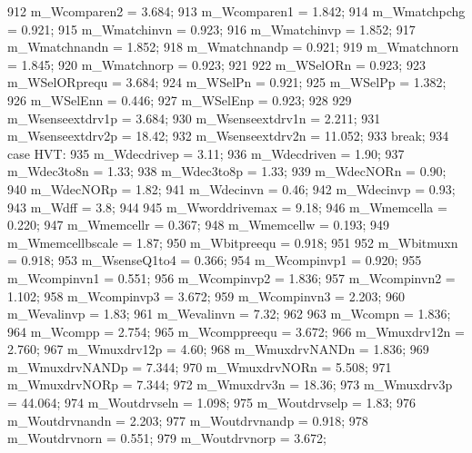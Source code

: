 \begin{DoxyCode}
{{{912                 m_Wcomparen2 = 3.684;
913                 m_Wcomparen1 = 1.842;
914                 m_Wmatchpchg = 0.921;
915                 m_Wmatchinvn = 0.923;
916                 m_Wmatchinvp = 1.852;
917                 m_Wmatchnandn = 1.852;
918                 m_Wmatchnandp = 0.921;
919                 m_Wmatchnorn = 1.845;
920                 m_Wmatchnorp = 0.923;
921 
922                 m_WSelORn = 0.923;
923                 m_WSelORprequ = 3.684;
924                 m_WSelPn = 0.921;
925                 m_WSelPp = 1.382;
926                 m_WSelEnn = 0.446;
927                 m_WSelEnp = 0.923;
928 
929                 m_Wsenseextdrv1p = 3.684;
930                 m_Wsenseextdrv1n = 2.211;
931                 m_Wsenseextdrv2p = 18.42;
932                 m_Wsenseextdrv2n = 11.052;
933                 break;
934             case HVT:
935                 m_Wdecdrivep = 3.11;
936                 m_Wdecdriven = 1.90;
937                 m_Wdec3to8n = 1.33;
938                 m_Wdec3to8p = 1.33;
939                 m_WdecNORn = 0.90;
940                 m_WdecNORp = 1.82;
941                 m_Wdecinvn = 0.46;
942                 m_Wdecinvp = 0.93;
943                 m_Wdff = 3.8;
944 
945                 m_Wworddrivemax = 9.18;
946                 m_Wmemcella = 0.220;
947                 m_Wmemcellr = 0.367;
948                 m_Wmemcellw = 0.193;
949                 m_Wmemcellbscale = 1.87;
950                 m_Wbitpreequ = 0.918;
951 
952                 m_Wbitmuxn = 0.918;
953                 m_WsenseQ1to4 = 0.366;
954                 m_Wcompinvp1 = 0.920;
955                 m_Wcompinvn1 = 0.551;
956                 m_Wcompinvp2 = 1.836;
957                 m_Wcompinvn2 = 1.102;
958                 m_Wcompinvp3 = 3.672;
959                 m_Wcompinvn3 = 2.203;
960                 m_Wevalinvp = 1.83;
961                 m_Wevalinvn = 7.32;
962 
963                 m_Wcompn = 1.836;
964                 m_Wcompp = 2.754;
965                 m_Wcomppreequ = 3.672;
966                 m_Wmuxdrv12n = 2.760;
967                 m_Wmuxdrv12p = 4.60;
968                 m_WmuxdrvNANDn = 1.836;
969                 m_WmuxdrvNANDp = 7.344;
970                 m_WmuxdrvNORn = 5.508;
971                 m_WmuxdrvNORp = 7.344;
972                 m_Wmuxdrv3n = 18.36;
973                 m_Wmuxdrv3p = 44.064;
974                 m_Woutdrvseln = 1.098;
975                 m_Woutdrvselp = 1.83;
976                 m_Woutdrvnandn = 2.203;
977                 m_Woutdrvnandp = 0.918;
978                 m_Woutdrvnorn = 0.551;
979                 m_Woutdrvnorp = 3.672;
}}}
\end{DoxyCode}
